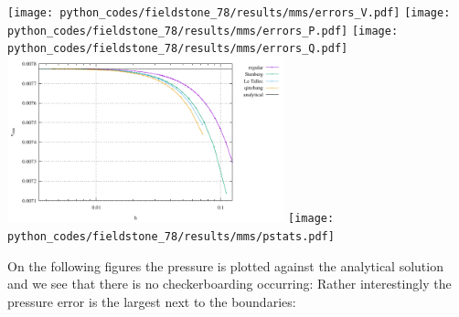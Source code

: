 \begin{center}
\texttt{[image: python\_codes/fieldstone\_78/results/mms/errors\_V.pdf]}
\texttt{[image: python\_codes/fieldstone\_78/results/mms/errors\_P.pdf]}
\texttt{[image: python\_codes/fieldstone\_78/results/mms/errors\_Q.pdf]}\\
\includegraphics[width=8cm]{python_codes/fieldstone_78/results/mms/vrms.pdf}
\texttt{[image: python\_codes/fieldstone\_78/results/mms/pstats.pdf]}
\end{center}

On the following figures the pressure is plotted against the analytical solution and 
we see that there is no checkerboarding occurring:
Rather interestingly the pressure error is the largest next to the boundaries:

